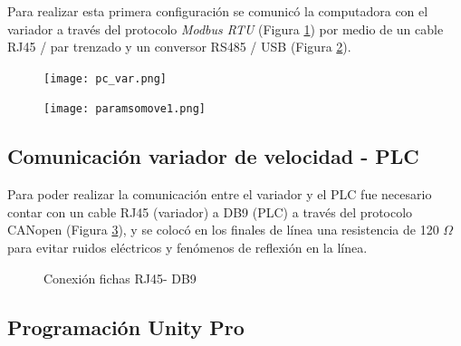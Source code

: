 Para realizar esta primera configuración se comunicó la computadora con el variador a través del protocolo \textit{Modbus RTU} (Figura \ref{fig:pcvar}) por medio de un cable RJ45 / par trenzado y un conversor RS485 / USB (Figura \ref{fig:paramsomove1}). 
\begin{figure}[H]
	\centering
	\texttt{[image: pc\_var.png]}
	\label{fig:pcvar}
\end{figure}

\begin{figure}[H]
	\centering
	\texttt{[image: paramsomove1.png]}
	\label{fig:paramsomove1}
\end{figure}


\subsection{Comunicación variador de velocidad - PLC}
Para poder realizar la comunicación entre el variador y el PLC fue necesario contar con un cable RJ45 (variador) a DB9 (PLC) a través del protocolo CANopen (Figura \ref{fig:cable}), y se colocó en los finales de línea una resistencia de 120 $\Omega$ para evitar ruidos eléctricos y fenómenos de reflexión en la línea.


\begin{figure}[htbp]
    \centering
    \caption{Conexión fichas RJ45- DB9} \label{fig:cable}
    \end{figure}



\subsection{Programación Unity Pro}


